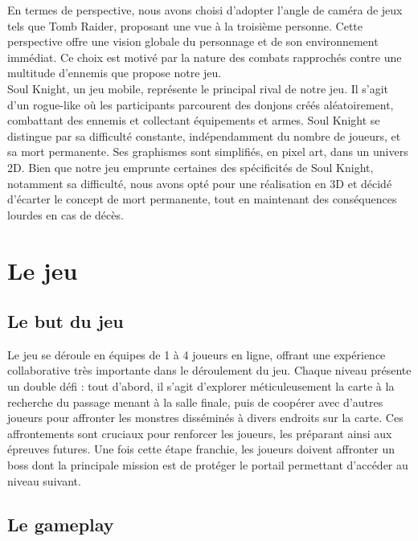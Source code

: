 \documentclass{article}
\begin{document}
En termes de perspective, nous avons choisi d'adopter l'angle de caméra de jeux tels que Tomb Raider, proposant une vue à la troisième personne. Cette perspective offre une vision globale du personnage et de son environnement immédiat. Ce choix est motivé par la nature des combats rapprochés contre une multitude d'ennemis que propose notre jeu.\\

Soul Knight, un jeu mobile, représente le principal rival de notre jeu. Il s'agit d'un rogue-like où les participants parcourent des donjons créés aléatoirement, combattant des ennemis et collectant équipements et armes. Soul Knight se distingue par sa difficulté constante, indépendamment du nombre de joueurs, et sa mort permanente. Ses graphismes sont simplifiés, en pixel art, dans un univers 2D.
Bien que notre jeu emprunte certaines des spécificités de Soul Knight, notamment sa difficulté, nous avons opté pour une réalisation en 3D et décidé d'écarter le concept de mort permanente, tout en maintenant des conséquences lourdes en cas de décès.
\section{Le jeu}
\subsection{Le but du jeu}
Le jeu se déroule en équipes de 1 à 4 joueurs en ligne, offrant une expérience collaborative très importante dans le déroulement du jeu. Chaque niveau présente un double défi : tout d'abord, il s'agit d'explorer méticuleusement la carte à la recherche du passage menant à la salle finale, puis de coopérer avec d'autres joueurs pour affronter les monstres disséminés à divers endroits sur la carte. Ces affrontements sont cruciaux pour renforcer les joueurs, les préparant ainsi aux épreuves futures. Une fois cette étape franchie, les joueurs doivent affronter un boss dont la principale mission est de protéger le portail permettant d'accéder au niveau suivant.
\subsection{Le gameplay}
\end{document}

